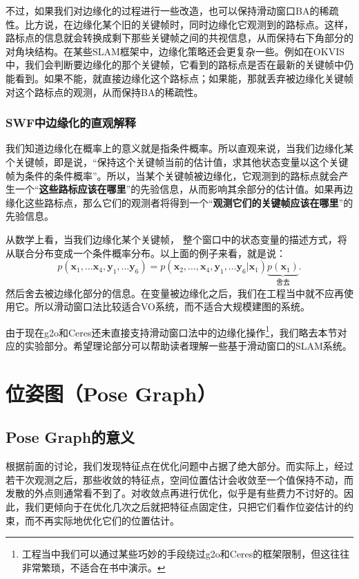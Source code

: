 不过，如果我们对边缘化的过程进行一些改造，也可以保持滑动窗口BA的稀疏性。比方说，在边缘化某个旧的关键帧时，同时边缘化它观测到的路标点。这样，路标点的信息就会转换成剩下那些关键帧之间的共视信息，从而保持右下角部分的对角块结构。在某些SLAM框架\textsuperscript{\cite{Leutenegger2015,Engel2016}}中，边缘化策略还会更复杂一些。例如在OKVIS中，我们会判断要边缘化的那个关键帧，它看到的路标点是否在最新的关键帧中仍能看到。如果不能，就直接边缘化这个路标点；如果能，那就丢弃被边缘化关键帧对这个路标点的观测，从而保持BA的稀疏性。

\subsubsection{SWF中边缘化的直观解释}
我们知道边缘化在概率上的意义就是指条件概率。所以直观来说，当我们边缘化某个关键帧，即是说，“保持这个关键帧当前的估计值，求其他状态变量以这个关键帧为条件的条件概率”。所以，当某个关键帧被边缘化，它观测到的路标点就会产生一个“\textbf{这些路标应该在哪里}”的先验信息，从而影响其余部分的估计值。如果再边缘化这些路标点，那么它们的观测者将得到一个“\textbf{观测它们的关键帧应该在哪里}”的先验信息。

从数学上看，当我们边缘化某个关键帧， 整个窗口中的状态变量的描述方式，将从联合分布变成一个条件概率分布。以上面的例子来看，就是说：
\begin{equation}
p\left( {{\bm{x}_1}, \ldots {\bm{x}_4},{\bm{y}_1}, \ldots {\bm{y}_6}} \right) = p\left( {{\bm{x}_2}, \ldots ,{\bm{x}_4},{\bm{y}_1}, \ldots {\bm{y}_6}|{\bm{x}_1}} \right)\underbrace {p\left( {{\bm{x}_1}} \right)}_{\text{舍去}}.
\end{equation}
然后舍去被边缘化部分的信息。在变量被边缘化之后，我们在工程当中就不应再使用它。所以滑动窗口法比较适合VO系统，而不适合大规模建图的系统。

由于现在g2o和Ceres还未直接支持滑动窗口法中的边缘化操作\footnote{工程当中我们可以通过某些巧妙的手段绕过g2o和Ceres的框架限制，但这往往非常繁琐，不适合在书中演示。}，我们略去本节对应的实验部分。希望理论部分可以帮助读者理解一些基于滑动窗口的SLAM系统。

\section{位姿图（Pose Graph）}
\subsection{Pose Graph的意义}
根据前面的讨论，我们发现特征点在优化问题中占据了绝大部分。而实际上，经过若干次观测之后，那些收敛的特征点，空间位置估计会收敛至一个值保持不动，而发散的外点则通常看不到了。对收敛点再进行优化，似乎是有些费力不讨好的。因此，我们更倾向于在优化几次之后就把特征点固定住，只把它们看作位姿估计的约束，而不再实际地优化它们的位置估计。

